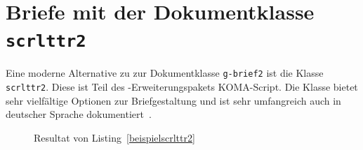 \documentclass[a4paper,10pt,twoside]{scrbook}
\begin{document}
\section{Briefe mit der Dokumentklasse \texttt{scrlttr2}}

Eine moderne Alternative zu zur Dokumentklasse \verb!g-brief2! ist die Klasse \verb!scrlttr2!. Diese ist Teil des \LaTeXe-Erweiterungspakets KOMA-Script. Die Klasse bietet sehr vielfältige Optionen zur Briefgestaltung und ist sehr umfangreich auch in deutscher Sprache dokumentiert~\cite{KOMAScript_Dokumentation}.




\begin{figure}[H]
    \caption{Resultat von Listing~\ref{beispielscrlttr2}}
    \label{fig_scrlttr2}
\end{figure}
\end{document}
